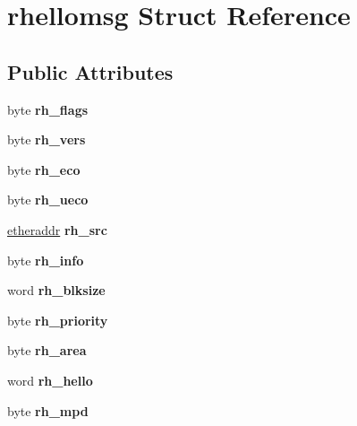 \hypertarget{structrhellomsg}{
\section{rhellomsg Struct Reference}
\label{structrhellomsg}
}
\subsection*{Public Attributes}
\begin{DoxyCompactItemize}
\item 
\hypertarget{structrhellomsg_ae9d5777c52622a39f1049e6f40b7771a}{
byte {\bfseries rh\_\-flags}}
\label{structrhellomsg_ae9d5777c52622a39f1049e6f40b7771a}

\item 
\hypertarget{structrhellomsg_adef2f6bfff75628641a4c242aecf6e2a}{
byte {\bfseries rh\_\-vers}}
\label{structrhellomsg_adef2f6bfff75628641a4c242aecf6e2a}

\item 
\hypertarget{structrhellomsg_a4819046d7455522be92e7d0d89b9056b}{
byte {\bfseries rh\_\-eco}}
\label{structrhellomsg_a4819046d7455522be92e7d0d89b9056b}

\item 
\hypertarget{structrhellomsg_a471264e624958b1fce3ce562e0497255}{
byte {\bfseries rh\_\-ueco}}
\label{structrhellomsg_a471264e624958b1fce3ce562e0497255}

\item 
\hypertarget{structrhellomsg_a524dbb1f63a53656ac361b1aa4206e39}{
\hyperlink{unionetheraddress}{etheraddr} {\bfseries rh\_\-src}}
\label{structrhellomsg_a524dbb1f63a53656ac361b1aa4206e39}

\item 
\hypertarget{structrhellomsg_aaf12495cab86662550f39b2534f4352b}{
byte {\bfseries rh\_\-info}}
\label{structrhellomsg_aaf12495cab86662550f39b2534f4352b}

\item 
\hypertarget{structrhellomsg_a90b938e5294d500b2e8a2a5fec183d82}{
word {\bfseries rh\_\-blksize}}
\label{structrhellomsg_a90b938e5294d500b2e8a2a5fec183d82}

\item 
\hypertarget{structrhellomsg_a75c199e9f6a19a539e7b05b3fa481e53}{
byte {\bfseries rh\_\-priority}}
\label{structrhellomsg_a75c199e9f6a19a539e7b05b3fa481e53}

\item 
\hypertarget{structrhellomsg_a1397b57a1f3070666f8d3026c1576118}{
byte {\bfseries rh\_\-area}}
\label{structrhellomsg_a1397b57a1f3070666f8d3026c1576118}

\item 
\hypertarget{structrhellomsg_a90f89743e87202bd2fdd4ec9f344c457}{
word {\bfseries rh\_\-hello}}
\label{structrhellomsg_a90f89743e87202bd2fdd4ec9f344c457}

\item 
\hypertarget{structrhellomsg_a55ed19ac5edad5cbfdb1661d2041b5ce}{
byte {\bfseries rh\_\-mpd}}
\label{structrhellomsg_a55ed19ac5edad5cbfdb1661d2041b5ce}

\end{DoxyCompactItemize}


